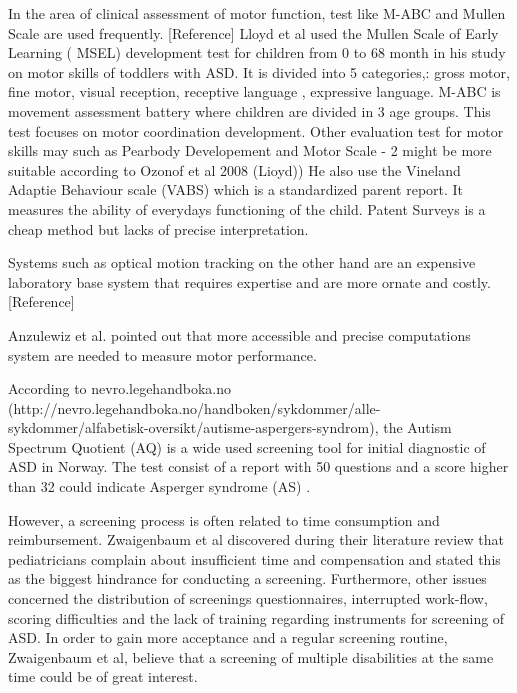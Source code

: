 In the area of clinical assessment of motor function, test like M-ABC and Mullen Scale are used frequently. [Reference]
Lloyd et al used the Mullen Scale of Early Learning ( MSEL) development test for children from 0 to 68 month in his study on motor skills of toddlers with ASD. It is divided into 5 categories,: gross motor, fine motor, visual reception,  receptive language , expressive language.
M-ABC is movement assessment battery where children are divided in 3 age groups. This test focuses on  motor coordination development.  
Other evaluation test for  motor skills may such as  Pearbody Developement and Motor Scale - 2 might be more suitable according to Ozonof et al 2008 (Lioyd))
He also use the Vineland Adaptie Behaviour scale (VABS) which is a standardized parent report. It measures the ability of everydays functioning of the child. Patent Surveys is a cheap method but lacks of precise interpretation.

Systems such as optical motion tracking on the other hand  are an expensive laboratory base system that requires expertise and are more ornate and costly. [Reference]

Anzulewiz et al. pointed out that more accessible and precise computations system are needed to measure motor performance.


According to nevro.legehandboka.no (http://nevro.legehandboka.no/handboken/sykdommer/alle-sykdommer/alfabetisk-oversikt/autisme-aspergers-syndrom), the Autism Spectrum Quotient (AQ) is a wide used screening tool for initial diagnostic of ASD in Norway. The test consist of a report with 50 questions and a score higher than 32 could indicate Asperger syndrome (AS) .

However, a screening process is often related to time consumption and reimbursement. Zwaigenbaum et al discovered during their literature review that pediatricians complain about insufficient time and compensation and stated this as the biggest hindrance for conducting a screening. Furthermore, other issues concerned the distribution of screenings questionnaires, interrupted work-flow, scoring difficulties and the lack of training regarding instruments for  screening of ASD. In order to gain more acceptance and a regular screening routine, Zwaigenbaum et al, believe that a  screening of multiple disabilities at the same time could be of great interest.



